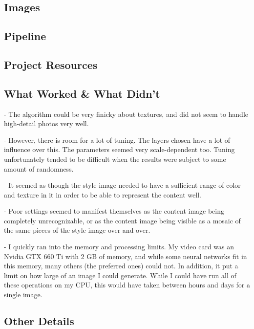 \documentclass{article}
\begin{document}

\subsection{Images}

\subsection{Pipeline}

\subsection{Project Resources}


\subsection{What Worked \& What Didn't}

- The algorithm could be very finicky about textures, and did not seem
to handle high-detail photos very well.

- However, there is room for a lot of tuning.  The layers chosen have
a lot of influence over this.  The parameters seemed very
scale-dependent too.  Tuning unfortunately tended to be difficult when
the results were subject to some amount of randomness.

- It seemed as though the style image needed to have a sufficient
range of color and texture in it in order to be able to represent the
content well.

- Poor settings seemed to manifest themselves as the content image
being completely unrecognizable, or as the content image being visible
as a mosaic of the same pieces of the style image over and over.

- I quickly ran into the memory and processing limits.  My video card
was an Nvidia GTX 660 Ti with 2 GB of memory, and while some neural
networks fit in this memory, many others (the preferred ones) could
not.  In addition, it put a limit on how large of an image I could
generate.  While I could have run all of these operations on my CPU,
this would have taken between hours and days for a single image.

\subsection{Other Details}
\end{document}
